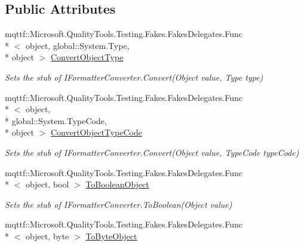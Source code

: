\subsection*{Public Attributes}
\begin{DoxyCompactItemize}
\item 
mqttf\-::\-Microsoft.\-Quality\-Tools.\-Testing.\-Fakes.\-Fakes\-Delegates.\-Func\\*
$<$ object, global\-::\-System.\-Type, \\*
object $>$ \hyperlink{class_system_1_1_runtime_1_1_serialization_1_1_fakes_1_1_stub_i_formatter_converter_a721547ee574e402db3b531317308217a}{Convert\-Object\-Type}
\begin{DoxyCompactList}\small\item\em Sets the stub of I\-Formatter\-Converter.\-Convert(\-Object value, Type type)\end{DoxyCompactList}\item 
mqttf\-::\-Microsoft.\-Quality\-Tools.\-Testing.\-Fakes.\-Fakes\-Delegates.\-Func\\*
$<$ object, \\*
global\-::\-System.\-Type\-Code, \\*
object $>$ \hyperlink{class_system_1_1_runtime_1_1_serialization_1_1_fakes_1_1_stub_i_formatter_converter_ab8ef9c147f4d5e5cd836f1475aed36ba}{Convert\-Object\-Type\-Code}
\begin{DoxyCompactList}\small\item\em Sets the stub of I\-Formatter\-Converter.\-Convert(\-Object value, Type\-Code type\-Code)\end{DoxyCompactList}\item 
mqttf\-::\-Microsoft.\-Quality\-Tools.\-Testing.\-Fakes.\-Fakes\-Delegates.\-Func\\*
$<$ object, bool $>$ \hyperlink{class_system_1_1_runtime_1_1_serialization_1_1_fakes_1_1_stub_i_formatter_converter_a1f66e3554e4e708702fb3c0b9152741b}{To\-Boolean\-Object}
\begin{DoxyCompactList}\small\item\em Sets the stub of I\-Formatter\-Converter.\-To\-Boolean(\-Object value)\end{DoxyCompactList}\item 
mqttf\-::\-Microsoft.\-Quality\-Tools.\-Testing.\-Fakes.\-Fakes\-Delegates.\-Func\\*
$<$ object, byte $>$ \hyperlink{class_system_1_1_runtime_1_1_serialization_1_1_fakes_1_1_stub_i_formatter_converter_a7d5031cf6d118b3f4db4fd18e7ae8fa8}{To\-Byte\-Object}

\end{DoxyCompactItemize}
